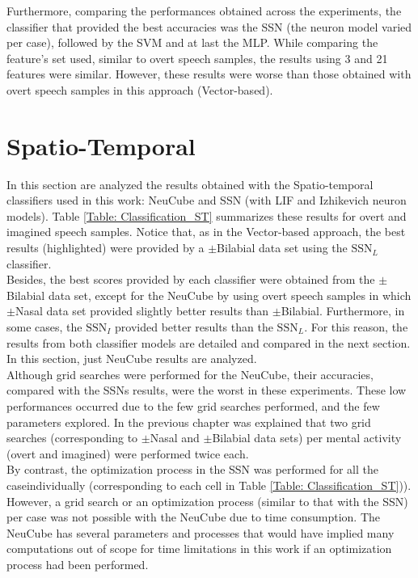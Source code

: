 Furthermore, comparing the performances obtained across the experiments, the classifier that provided the best accuracies was the SSN (the neuron model varied per case), followed by the SVM and at last the MLP. While comparing the feature's set used, similar to overt speech samples, the results using 3 and 21 features were similar. However, these results were worse than those obtained with overt speech samples in this approach (Vector-based).\\

\section{Spatio-Temporal}
In this section are analyzed the results obtained with the Spatio-temporal classifiers used in this work: NeuCube and SSN (with LIF and Izhikevich neuron models). Table \ref{Table: Classification_ST} summarizes these results for overt and imagined speech samples. Notice that, as in the Vector-based approach, the best results (highlighted) were provided by a $\pm$Bilabial data set using the $\mbox{SSN}_{L}$ classifier.\\

Besides, the best scores provided by each classifier were obtained from the $\pm$Bilabial data set, except for the NeuCube by using overt speech samples in which $\pm$Nasal data set provided slightly better results than $\pm$Bilabial. Furthermore, in some cases, the $\mbox{SSN}_{I}$  provided better results than the $\mbox{SSN}_{L}$. For this reason, the results from both classifier models are detailed and compared in the next section. In this section, just NeuCube results are analyzed.\\

Although grid searches were performed for the NeuCube, their accuracies, compared with the SSNs results, were the worst in these experiments. These low performances occurred due to the few grid searches performed, and the few parameters explored. In the previous chapter was explained that two grid searches (corresponding to $\pm$Nasal and $\pm$Bilabial data sets) per mental activity (overt and imagined) were performed twice each.\\

By contrast, the optimization process in the SSN was performed for all the case\linebreak[4] individually (corresponding to each cell in Table \ref{Table: Classification_ST})). However, a grid search or an optimization process (similar to that with the SSN) per case was not possible with the NeuCube due to time consumption. The NeuCube has several parameters and processes that would have implied many computations out of scope for time limitations in this work if an optimization process had been performed.\\

